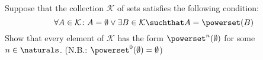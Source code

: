 \begin{Exercise} [number=35, difficulty=1]
  Suppose that the collection $\mathcal{K}$ of sets satisfies the
  following condition:
  \begin{displaymath}
    \forall{A} \in \mathcal{K} \colon A = \emptyset \lor \exists{B \in
    \mathcal{K}} \suchthat A = \powerset(B)
  \end{displaymath}
  \ExeText Show that every element of $\mathcal{K}$ has the form
  $\powerset^n(\emptyset)$ for some $n \in \naturals$. (N.B.:
  $\powerset^0(\emptyset) = \emptyset$)
\end{Exercise}


